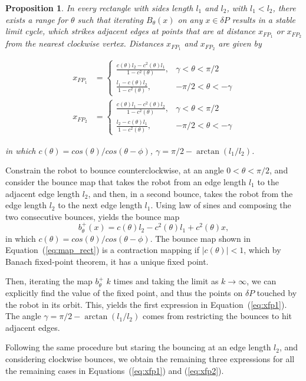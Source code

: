\documentclass[10pt,a4paper]{article}
\newtheorem{proposition}[theorem]{\bf Proposition}
\newenvironment{sproof}{%
  \renewcommand{\proofname}{Sketch of Proof}\proof}{\endproof}
\begin{document}
\begin{proposition} \label{Proposition:rectangle}
In every rectangle with sides length $l_1$ and $l_2$, with $l_1<l_2$, there exists a range for $\theta$ such that iterating $B_{\theta}(x)$ on any $x \in \delta P$ results in a stable limit cycle, which strikes adjacent edges at points that are at distance $x_{FP_1}$ or $x_{FP_2}$  from the nearest clockwise vertex. Distances $x_{FP_1}$ and $x_{FP_2}$ are given by

\begin{align}
x_{FP_1} & = 
\begin{cases} \label{eq:xfp1}
        \frac{c(\theta) l_2 - c^2(\theta) l_1}{1 - c^2(\theta)}, & \gamma < \theta
< \pi/2 \\
        \frac{l_1 - c(\theta) l_2}{1 - c^2(\theta)}, & -\pi/2 < \theta
< -\gamma
\end{cases} \\
x_{FP_2} &= 
\begin{cases} \label{eq:xfp2}
 \frac{c(\theta) l_1 - c^2(\theta) l_2}{1 - c^2(\theta)}, & \gamma < \theta
< \pi/2 \\
        \frac{l_2 - c(\theta) l_1}{1 - c^2(\theta)}, & -\pi/2 < \theta
< -\gamma
\end{cases}
\end{align}

\noindent in which $c(\theta) = cos(\theta) / cos(\theta - \phi)$, $\gamma = \pi/2 - \arctan(l_1/l_2)$. 
\end{proposition}
\begin{sproof}
Constrain the robot to bounce counterclockwise, at an angle $0 < \theta < \pi/2$, and consider the bounce map that takes the robot from an edge length $l_1$ to the adjacent edge length $l_2$, and then, in a second bounce, takes the robot from the edge length $l_2$ to the next edge length $l_1$.
Using law of sines and composing the two consecutive bounces, yields the bounce map 
\begin{equation} \label{eq:map_rect}
b^+_{\theta}(x) = c(\theta)l_2 - c^2(\theta)l_1 + c^2(\theta)x,
\end{equation}
in which $c(\theta) = cos(\theta) / cos(\theta - \phi)$. 
The bounce map shown in Equation~(\ref{eq:map_rect}) is a contraction mapping
if $|c(\theta)| < 1$, which by Banach fixed-point theorem, it has a unique fixed point.
 
Then, iterating the map $b^+_{\theta}$ $k$ times and taking the limit as $k \to \infty$, we can explicitly find the value of the fixed point, and thus the points on $\delta P$ touched by the robot in its orbit. This, yields the first expression in Equation~(\ref{eq:xfp1}). The angle $\gamma = \pi/2 - \arctan(l_1/l_2)$ comes from restricting the bounces to hit adjacent edges. 

Following the same procedure but staring the bouncing at an edge length $l_2$, and considering clockwise bounces, we obtain the remaining three expressions for all the remaining cases in Equations~(\ref{eq:xfp1}) and (\ref{eq:xfp2}).
\end{sproof}
\end{document}
